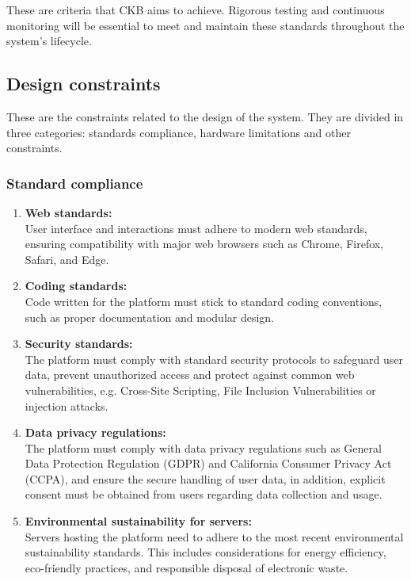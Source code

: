 These are criteria that CKB aims to achieve. Rigorous testing and continuous monitoring will be essential to meet and maintain these standards throughout the system’s lifecycle.

\subsection{Design constraints}
These are the constraints related to the design of the system. They are divided in three
categories: standards compliance, hardware limitations and other constraints.

\subsubsection{Standard compliance}
\begin{enumerate}
  \item \textbf{Web standards:} \\ 
  User interface and interactions must adhere to modern web standards, ensuring compatibility with major web browsers such as Chrome, Firefox, Safari, and Edge.
  \item \textbf{Coding standards:} \\
  Code written for the platform must stick to standard coding conventions, such as proper documentation and modular design.
  \item \textbf{Security standards:} \\
  The platform must comply with standard security protocols to safeguard user data, prevent unauthorized access and protect against common web vulnerabilities, e.g. Cross-Site Scripting, File Inclusion Vulnerabilities or injection attacks.
  \item \textbf{Data privacy regulations:} \\
  The platform must comply with data privacy regulations  such as General Data Protection Regulation (GDPR) and California Consumer Privacy Act (CCPA), and ensure the secure handling of user data, in addition, explicit consent must be obtained from users regarding data collection and usage.
  \item \textbf{Environmental sustainability for servers:} \\
  Servers hosting the platform need to adhere to the most recent environmental sustainability standards. This includes considerations for energy efficiency, eco-friendly practices, and responsible disposal of electronic waste.
\end{enumerate}

